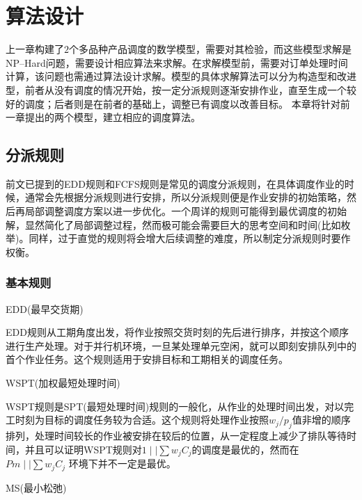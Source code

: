 \newcommand{\jobunit}[1]{*+[F]{\makebox[1.5em]{$#1$}}}
\newcommand{\process}[1]{*++=[o][F]{\makebox[2em]{$#1$}}}
\theoremheaderfont{\heiti}
\newtheorem{algori}[algor]{算法}%
\chapter{算法设计}
上一章构建了$2$个多品种产品调度的数学模型，需要对其检验，而这些模型求解是NP--Hard问题，需要设计相应算法来求解。在求解模型前，需要对订单处理时间计算，该问题也需通过算法设计求解。模型的具体求解算法可以分为构造型和改进型，前者从没有调度的情况开始，按一定分派规则逐渐安排作业，直至生成一个较好的调度；后者则是在前者的基础上，调整已有调度以改善目标。
本章将针对前一章提出的两个模型，建立相应的调度算法。

\section{分派规则}
前文已提到的EDD规则和FCFS规则是常见的调度分派规则，在具体调度作业的时候，通常会先根据分派规则进行安排，所以分派规则便是作业安排的初始策略，然后再局部调整调度方案以进一步优化。一个周详的规则可能得到最优调度的初始解，显然简化了局部调整过程，然而极可能会需要巨大的思考空间和时间(比如枚举)。同样，过于直觉的规则将会增大后续调整的难度，所以制定分派规则时要作权衡。
\subsection{基本规则}
\begin{asparaenum}
\item EDD(最早交货期)

EDD规则从工期角度出发，将作业按照交货时刻的先后进行排序，并按这个顺序进行生产处理。对于并行机环境，一旦某处理单元空闲，就可以即刻安排队列中的首个作业任务。这个规则适用于安排目标和工期相关的调度任务。
\item WSPT(加权最短处理时间)

WSPT规则是SPT(最短处理时间)规则的一般化，从作业的处理时间出发，对以完工时刻为目标的调度任务较为合适。这个规则将处理作业按照$w_j/p_j$值非增的顺序排列，处理时间较长的作业被安排在较后的位置，从一定程度上减少了排队等待时间，并且可以证明WSPT规则对$1\mid \mid \sum w_jC_j$的调度是最优的\cite{pinedo}，然而在$Pm \mid \mid \sum w_jC_j$ 环境下并不一定是最优。

\item MS(最小松弛)
\end{asparaenum}

